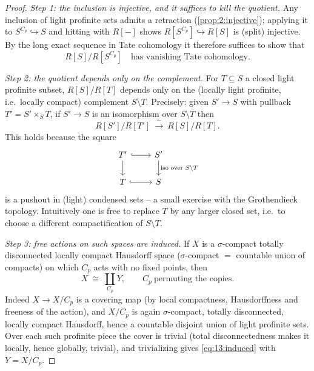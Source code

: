 \begin{proof}
\emph{Step 1: the inclusion is injective, and it suffices to kill the quotient.}
Any inclusion of light profinite sets admits a retraction
(\cref{prop:2:injective}); applying it to $S^{C_p}\hookrightarrow S$ and hitting
with $R[-]$ shows $R[S^{C_p}]\hookrightarrow R[S]$ is (split) injective. By the
long exact sequence in Tate cohomology it therefore suffices to show that
\begin{equation}
\label{eq:13:quotient-vanishes}
R[S]\big/R[S^{C_p}]\quad\text{has vanishing Tate cohomology.}
\end{equation}

\emph{Step 2: the quotient depends only on the complement.} For $T\subseteq S$ a
closed light profinite subset, $R[S]/R[T]$ depends only on the (locally light
profinite, i.e.\ locally compact) complement $S\setminus T$. Precisely: given
$S'\to S$ with pullback $T'=S'\times_S T$, if $S'\to S$ is an isomorphism over
$S\setminus T$ then
\begin{equation*}
R[S']\big/R[T']\ \xrightarrow{\ \sim\ }\ R[S]\big/R[T].
\end{equation*}
This holds because the square
\begin{equation*}
\begin{tikzcd}
T' \arrow[r, hook] \arrow[d] & S' \arrow[d, "\text{iso over }S\setminus T"] \\
T \arrow[r, hook] & S
\end{tikzcd}
\end{equation*}
is a pushout in (light) condensed sets -- a small exercise with the Grothendieck
topology. Intuitively one is free to replace $T$ by any larger closed set, i.e.\
to choose a different compactification of $S\setminus T$.

\emph{Step 3: free actions on such spaces are induced.} If $X$ is a
$\sigma$-compact totally disconnected locally compact Hausdorff space
($\sigma$-compact $=$ countable union of compacts) on which $C_p$ acts with no
fixed points, then
\begin{equation}
\label{eq:13:induced}
X\ \cong\ \coprod_{C_p} Y,\qquad C_p\ \text{permuting the copies.}
\end{equation}
Indeed $X\to X/C_p$ is a covering map (by local compactness, Hausdorffness and
freeness of the action), and $X/C_p$ is again $\sigma$-compact, totally
disconnected, locally compact Hausdorff, hence a countable disjoint union of
light profinite sets. Over each such profinite piece the cover is trivial (total
disconnectedness makes it locally, hence globally, trivial), and trivializing
gives \eqref{eq:13:induced} with $Y=X/C_p$.


\end{proof}
